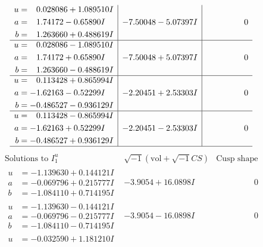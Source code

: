 \documentclass[1p]{elsarticle_modified}
\theoremstyle{definition}
\newcommand{\I}{\sqrt{-1}}
\begin{document}
$$\begin{array}{c|c|c}
\begin{aligned}
u &= \phantom{-}0.028086 + 1.089510 I \\
a &= \phantom{-}1.74172 - 0.65890 I \\
b &= \phantom{-}1.263660 + 0.488619 I\end{aligned}
 & -7.50048 - 5.07397 I & \phantom{-0.000000 } 0 \\ \hline\begin{aligned}
u &= \phantom{-}0.028086 - 1.089510 I \\
a &= \phantom{-}1.74172 + 0.65890 I \\
b &= \phantom{-}1.263660 - 0.488619 I\end{aligned}
 & -7.50048 + 5.07397 I & \phantom{-0.000000 } 0 \\ \hline\begin{aligned}
u &= \phantom{-}0.113428 + 0.865994 I \\
a &= -1.62163 - 0.52299 I \\
b &= -0.486527 - 0.936129 I\end{aligned}
 & -2.20451 + 2.53303 I & \phantom{-0.000000 } 0 \\ \hline\begin{aligned}
u &= \phantom{-}0.113428 - 0.865994 I \\
a &= -1.62163 + 0.52299 I \\
b &= -0.486527 + 0.936129 I\end{aligned}
 & -2.20451 - 2.53303 I & \phantom{-0.000000 } 0\\
 \hline 
 \end{array}$$\newpage$$\begin{array}{c|c|c}  
\text{Solutions to }I^u_{1}& \I (\text{vol} + \sqrt{-1}CS) & \text{Cusp shape}\\
 \hline 
\begin{aligned}
u &= -1.139630 + 0.144121 I \\
a &= -0.069796 + 0.215777 I \\
b &= -1.084110 + 0.714195 I\end{aligned}
 & -3.9054 + 16.0898 I & \phantom{-0.000000 } 0 \\ \hline\begin{aligned}
u &= -1.139630 - 0.144121 I \\
a &= -0.069796 - 0.215777 I \\
b &= -1.084110 - 0.714195 I\end{aligned}
 & -3.9054 - 16.0898 I & \phantom{-0.000000 } 0 \\ \hline\begin{aligned}
u &= -0.032590 + 1.181210 I \\

\end{aligned}
\end{array}$$
\end{document}
